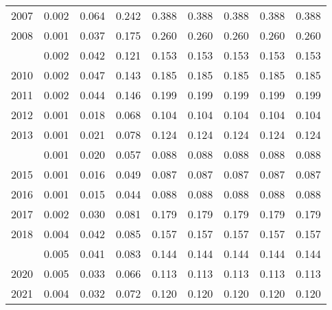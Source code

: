 \documentclass[
]{article}
\begin{document}
\begin{longtable}[t]{lrrrrrrrr}
2007 & 0.002 & 0.064 & 0.242 & 0.388 & 0.388 & 0.388 & 0.388 & 0.388\\
2008 & 0.001 & 0.037 & 0.175 & 0.260 & 0.260 & 0.260 & 0.260 & 0.260\\
\addlinespace
2009 & 0.002 & 0.042 & 0.121 & 0.153 & 0.153 & 0.153 & 0.153 & 0.153\\
2010 & 0.002 & 0.047 & 0.143 & 0.185 & 0.185 & 0.185 & 0.185 & 0.185\\
2011 & 0.002 & 0.044 & 0.146 & 0.199 & 0.199 & 0.199 & 0.199 & 0.199\\
2012 & 0.001 & 0.018 & 0.068 & 0.104 & 0.104 & 0.104 & 0.104 & 0.104\\
2013 & 0.001 & 0.021 & 0.078 & 0.124 & 0.124 & 0.124 & 0.124 & 0.124\\
\addlinespace
2014 & 0.001 & 0.020 & 0.057 & 0.088 & 0.088 & 0.088 & 0.088 & 0.088\\
2015 & 0.001 & 0.016 & 0.049 & 0.087 & 0.087 & 0.087 & 0.087 & 0.087\\
2016 & 0.001 & 0.015 & 0.044 & 0.088 & 0.088 & 0.088 & 0.088 & 0.088\\
2017 & 0.002 & 0.030 & 0.081 & 0.179 & 0.179 & 0.179 & 0.179 & 0.179\\
2018 & 0.004 & 0.042 & 0.085 & 0.157 & 0.157 & 0.157 & 0.157 & 0.157\\
\addlinespace
2019 & 0.005 & 0.041 & 0.083 & 0.144 & 0.144 & 0.144 & 0.144 & 0.144\\
2020 & 0.005 & 0.033 & 0.066 & 0.113 & 0.113 & 0.113 & 0.113 & 0.113\\
2021 & 0.004 & 0.032 & 0.072 & 0.120 & 0.120 & 0.120 & 0.120 & 0.120\\*
\end{longtable}
\end{document}
